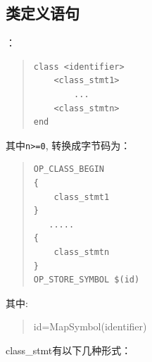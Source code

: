 \subsection{类定义语句}
：
\begin{quote}
\begin{verbatim}
class <identifier> 
    <class_stmt1>
        ...
    <class_stmtn>
end
\end{verbatim}
\end{quote}
其中\verb|n>=0|,
转换成字节码为：
\begin{quote}
\begin{verbatim}
OP_CLASS_BEGIN
{
    class_stmt1
}
   .....
{
    class_stmtn
}
OP_STORE_SYMBOL $(id)
\end{verbatim}
\end{quote}
其中:
\begin{quote}
id=MapSymbol(identifier)
\end{quote}
class\_stmt有以下几种形式：
